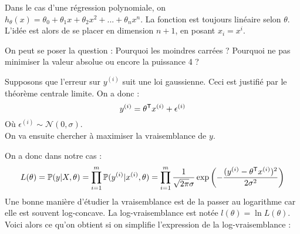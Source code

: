 

Dans le cas d'une régression polynomiale, on $h_\theta(x) = \theta_0 + \theta_1 x + \theta_2 x^2 + ... + \theta_n x^n$. La fonction est toujours linéaire selon $\theta$. L'idée est alors de se placer en dimension $n+1$, en posant $x_i = x^i$.


On peut se poser la question : Pourquoi les moindres carrées ? Pourquoi ne pas minimiser la valeur absolue ou encore la puissance 4 ?

Supposons que l'erreur sur $y^{(i)}$ suit une loi gaussienne. Ceci est justifié par le théorème centrale limite. On a donc :
$$ y^{(i)} = \theta^{\mathsf{T}} x^{(i)} + \epsilon^{(i)} $$
Où $\epsilon^{(i)} \sim \mathcal{N}(0, \sigma)$. \\
On va ensuite chercher à maximiser la vraisemblance de $y$.


On a donc dans notre cas :
$$ L(\theta) = \mathbb{P}(y | X, \theta) = \prod_{i=1}^m \mathbb{P}(y^{(i)} | x^{(i)}, \theta) = \prod_{i=1}^m \dfrac{1}{\sqrt{2 \pi} \sigma} \exp \left( - \dfrac{(y^{(i)} - \theta^{\mathsf{T}} x^{(i)})^2}{2 \sigma^2} \right) $$
Une bonne manière d'étudier la vraisemblance est de la passer au logarithme car elle est souvent log-concave. La log-vraisemblance est notée $l(\theta) = \ln L(\theta)$. Voici alors ce qu'on obtient si on simplifie l'expression de la log-vraisemblance :

